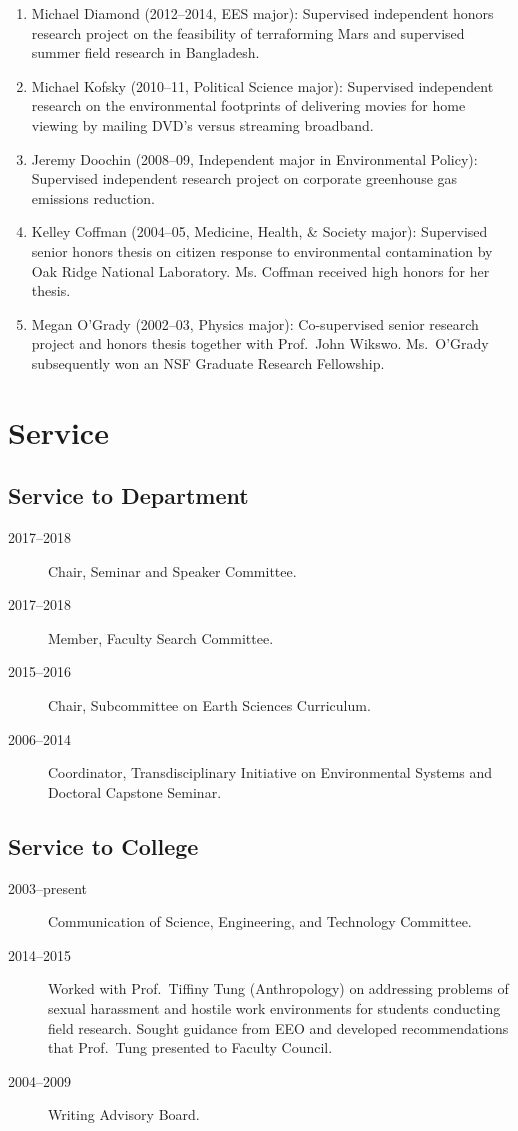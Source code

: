 \documentclass[10pt]{article}
\begin{document}
\begin{enumerate}
	\item Michael Diamond (2012--2014, EES major): Supervised independent honors research project on the feasibility of terraforming Mars and supervised summer field research in Bangladesh.
	\item Michael Kofsky (2010--11, Political Science major): Supervised independent research on the environmental footprints of delivering movies for home viewing by mailing DVD's versus streaming broadband.
    \item Jeremy Doochin (2008--09, Independent major in Environmental Policy): Supervised independent research project on corporate greenhouse gas emissions reduction.
	\item Kelley Coffman (2004--05, Medicine, Health, \& Society major): Supervised senior honors thesis on citizen response to environmental contamination by Oak Ridge National Laboratory. Ms. Coffman received high honors for her thesis.
	\item Megan O'Grady (2002--03, Physics major): Co-supervised senior research project and honors thesis together with Prof.~John Wikswo. Ms.~O'Grady subsequently won an NSF Graduate Research Fellowship.
	\end{enumerate}

\section{Service}
	\subsection{Service to Department}
    	\begin{description}
            \item[2017--2018] Chair, Seminar and Speaker Committee.
            \item[2017--2018] Member, Faculty Search Committee.
        	\item[2015--2016] Chair, Subcommittee on Earth Sciences Curriculum.
    		\item[2006--2014] Coordinator, Transdisciplinary Initiative on Environmental Systems and Doctoral Capstone Seminar.
    	\end{description}

	\subsection{Service to College}
    	\begin{description}
    		\item[2003--present] Communication of Science, Engineering, and Technology Committee.
    	    \item[2014--2015] Worked with Prof.\ Tiffiny Tung (Anthropology) on addressing problems of sexual harassment and hostile work environments for students conducting field research. Sought guidance from EEO and developed recommendations that Prof.\ Tung presented to Faculty Council.
    		\item[2004--2009] Writing Advisory Board.
    	\end{description}
\end{document}

